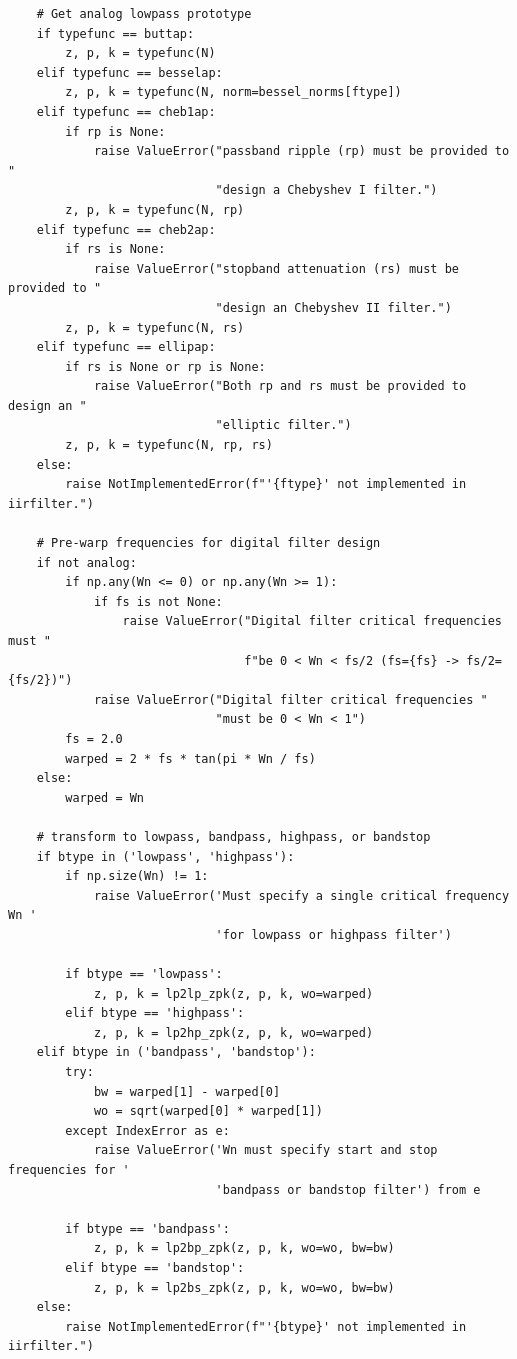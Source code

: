 \documentclass[12pt,a4paper]{article}
\begin{document}
\begin{itemize}
\begin{verbatim}
    # Get analog lowpass prototype
    if typefunc == buttap:
        z, p, k = typefunc(N)
    elif typefunc == besselap:
        z, p, k = typefunc(N, norm=bessel_norms[ftype])
    elif typefunc == cheb1ap:
        if rp is None:
            raise ValueError("passband ripple (rp) must be provided to "
                             "design a Chebyshev I filter.")
        z, p, k = typefunc(N, rp)
    elif typefunc == cheb2ap:
        if rs is None:
            raise ValueError("stopband attenuation (rs) must be provided to "
                             "design an Chebyshev II filter.")
        z, p, k = typefunc(N, rs)
    elif typefunc == ellipap:
        if rs is None or rp is None:
            raise ValueError("Both rp and rs must be provided to design an "
                             "elliptic filter.")
        z, p, k = typefunc(N, rp, rs)
    else:
        raise NotImplementedError(f"'{ftype}' not implemented in iirfilter.")

    # Pre-warp frequencies for digital filter design
    if not analog:
        if np.any(Wn <= 0) or np.any(Wn >= 1):
            if fs is not None:
                raise ValueError("Digital filter critical frequencies must "
                                 f"be 0 < Wn < fs/2 (fs={fs} -> fs/2={fs/2})")
            raise ValueError("Digital filter critical frequencies "
                             "must be 0 < Wn < 1")
        fs = 2.0
        warped = 2 * fs * tan(pi * Wn / fs)
    else:
        warped = Wn

    # transform to lowpass, bandpass, highpass, or bandstop
    if btype in ('lowpass', 'highpass'):
        if np.size(Wn) != 1:
            raise ValueError('Must specify a single critical frequency Wn '
                             'for lowpass or highpass filter')

        if btype == 'lowpass':
            z, p, k = lp2lp_zpk(z, p, k, wo=warped)
        elif btype == 'highpass':
            z, p, k = lp2hp_zpk(z, p, k, wo=warped)
    elif btype in ('bandpass', 'bandstop'):
        try:
            bw = warped[1] - warped[0]
            wo = sqrt(warped[0] * warped[1])
        except IndexError as e:
            raise ValueError('Wn must specify start and stop frequencies for '
                             'bandpass or bandstop filter') from e

        if btype == 'bandpass':
            z, p, k = lp2bp_zpk(z, p, k, wo=wo, bw=bw)
        elif btype == 'bandstop':
            z, p, k = lp2bs_zpk(z, p, k, wo=wo, bw=bw)
    else:
        raise NotImplementedError(f"'{btype}' not implemented in iirfilter.")


\end{verbatim}
\end{itemize}
\end{document}
